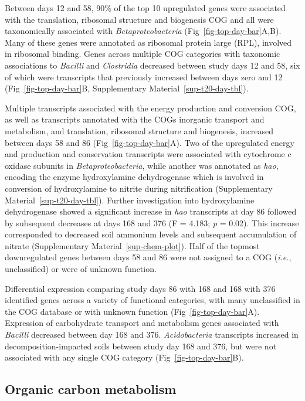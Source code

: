 \documentclass[
  sn-nature,
  lineno, referee]{sn-jnl}
\begin{document}
Between days 12 and 58, 90\% of the top 10 upregulated genes were
associated with the translation, ribosomal structure and biogenesis COG
and all were taxonomically associated with \emph{Betaproteobacteria}
(Fig~\ref{fig-top-day-bar}A,B). Many of these genes were annotated as
ribosomal protein large (RPL), involved in ribosomal binding. Genes
across multiple COG categories with taxonomic associations to
\emph{Bacilli} and \emph{Clostridia} decreased between study days 12 and
58, six of which were transcripts that previously increased between days
zero and 12 (Fig~\ref{fig-top-day-bar}B,
Supplementary Material~\ref{sup-t20-day-tbl}).

Multiple transcripts associated with the energy production and
conversion COG, as well as transcripts annotated with the COGs inorganic
transport and metabolism, and translation, ribosomal structure and
biogenesis, increased between days 58 and 86
(Fig~\ref{fig-top-day-bar}A). Two of the upregulated energy and
production and conservation transcripts were associated with cytochrome
c oxidase subunits in \emph{Betaproteobacteria}, while another was
annotated as \emph{hao}, encoding the enzyme hydroxylamine dehydrogenase
which is involved in conversion of hydroxylamine to nitrite during
nitrification (Supplementary Material~\ref{sup-t20-day-tbl}). Further
investigation into hydroxylamine dehydrogenase showed a significant
increase in \emph{hao} transcripts at day 86 followed by subsequent
decreases at days 168 and 376 (F = 4.183; \emph{p} = 0.02). This
increase corresponded to decreased soil ammonium levels and subsequent
accumulation of nitrate (Supplementary Material~\ref{sup-chem-plot}).
Half of the topmost downregulated genes between days 58 and 86 were not
assigned to a COG (\emph{i.e.}, unclassified) or were of unknown
function.

Differential expression comparing study days 86 with 168 and 168 with
376 identified genes across a variety of functional categories, with
many unclassified in the COG database or with unknown function
(Fig~\ref{fig-top-day-bar}A). Expression of carbohydrate transport and
metabolism genes associated with \emph{Bacilli} decreased between day
168 and 376. \emph{Acidobacteria} transcripts increased in
decomposition-impacted soils between study day 168 and 376, but were not
associated with any single COG category (Fig~\ref{fig-top-day-bar}B).

\subsection{Organic carbon metabolism}\label{organic-carbon-metabolism}
\end{document}
